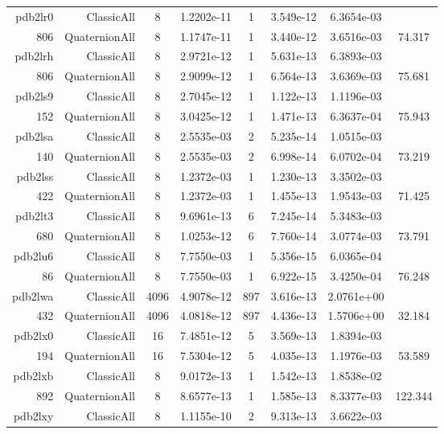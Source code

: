 \begin{xltabular}{\textwidth}{r|rcS[table-format=1.4e+2]cS[table-format=1.3e+2]S[table-format=1.4e+2]S[table-format=-1.3]}
pdb2lr0 & ClassicAll & 8 & 1.2202e-11 & 1 & 3.549e-12 & 6.3654e-03 & \\
806 & QuaternionAll & 8 & 1.1747e-11 & 1 & 3.440e-12 & 3.6516e-03 & 74.317\\  \addlinespace
pdb2lrh & ClassicAll & 8 & 2.9721e-12 & 1 & 5.631e-13 & 6.3893e-03 & \\
806 & QuaternionAll & 8 & 2.9099e-12 & 1 & 6.564e-13 & 3.6369e-03 & 75.681\\  \addlinespace
pdb2ls9 & ClassicAll & 8 & 2.7045e-12 & 1 & 1.122e-13 & 1.1196e-03 & \\
152 & QuaternionAll & 8 & 3.0425e-12 & 1 & 1.471e-13 & 6.3637e-04 & 75.943\\  \addlinespace
pdb2lsa & ClassicAll & 8 & 2.5535e-03 & 2 & 5.235e-14 & 1.0515e-03 & \\
140 & QuaternionAll & 8 & 2.5535e-03 & 2 & 6.998e-14 & 6.0702e-04 & 73.219\\  \addlinespace
pdb2lss & ClassicAll & 8 & 1.2372e-03 & 1 & 1.230e-13 & 3.3502e-03 & \\
422 & QuaternionAll & 8 & 1.2372e-03 & 1 & 1.455e-13 & 1.9543e-03 & 71.425\\  \addlinespace
pdb2lt3 & ClassicAll & 8 & 9.6961e-13 & 6 & 7.245e-14 & 5.3483e-03 & \\
680 & QuaternionAll & 8 & 1.0253e-12 & 6 & 7.760e-14 & 3.0774e-03 & 73.791\\  \addlinespace
pdb2lu6 & ClassicAll & 8 & 7.7550e-03 & 1 & 5.356e-15 & 6.0365e-04 & \\
86 & QuaternionAll & 8 & 7.7550e-03 & 1 & 6.922e-15 & 3.4250e-04 & 76.248\\  \addlinespace
pdb2lwa & ClassicAll & 4096 & 4.9078e-12 & 897 & 3.616e-13 & 2.0761e+00 & \\
432 & QuaternionAll & 4096 & 4.0818e-12 & 897 & 4.436e-13 & 1.5706e+00 & 32.184\\  \addlinespace
pdb2lx0 & ClassicAll & 16 & 7.4851e-12 & 5 & 3.569e-13 & 1.8394e-03 & \\
194 & QuaternionAll & 16 & 7.5304e-12 & 5 & 4.035e-13 & 1.1976e-03 & 53.589\\  \addlinespace
pdb2lxb & ClassicAll & 8 & 9.0172e-13 & 1 & 1.542e-13 & 1.8538e-02 & \\
892 & QuaternionAll & 8 & 8.6577e-13 & 1 & 1.585e-13 & 8.3377e-03 & 122.344\\  \addlinespace
pdb2lxy & ClassicAll & 8 & 1.1155e-10 & 2 & 9.313e-13 & 3.6622e-03 & \\

\end{xltabular}
